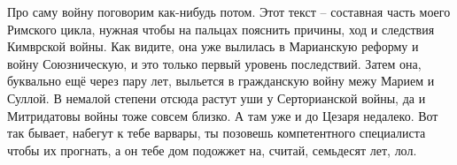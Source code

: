 Про саму войну поговорим как-нибудь потом. Этот текст -- составная часть моего Римского цикла, нужная чтобы на пальцах пояснить причины, ход и следствия Кимврской войны. Как видите, она уже вылилась в Марианскую реформу и войну Союзническую, и это только первый уровень последствий. Затем она, буквально ещё через пару лет, выльется в гражданскую войну межу Марием и Суллой. В немалой степени отсюда растут уши у Серторианской войны, да и Митридатовы войны тоже совсем близко. А там уже и до Цезаря недалеко. Вот так бывает, набегут к тебе варвары, ты позовешь компетентного специалиста чтобы их прогнать, а он тебе дом подожжет на, считай, семьдесят лет, лол. 
